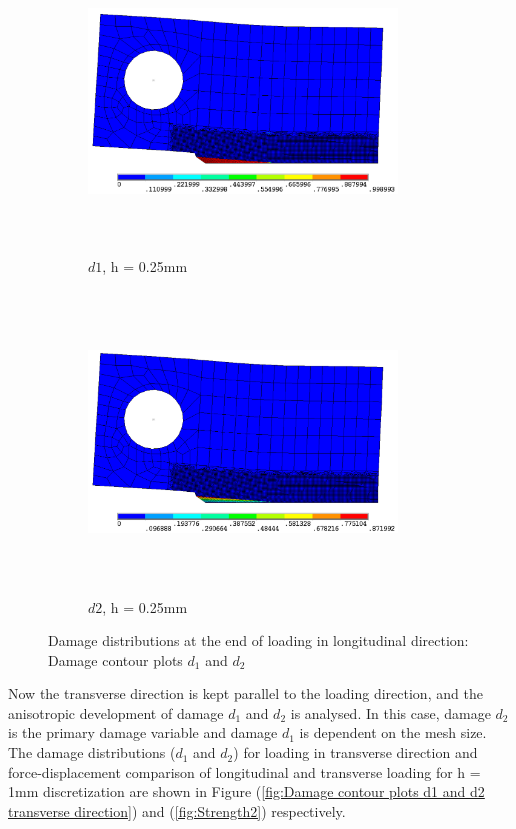 \documentclass[12pt,a4paper,twoside,openright]{report}
\begin{document}
\begin{figure}[htbp!]\ContinuedFloat
     \begin{subfigure}{0.4\textwidth}
         \includegraphics[width=8.2cm,height=8cm,keepaspectratio]{26.d1-0.25.png}
         \caption{$d1$, h = 0.25mm}
         \label{fig:d1-0.25}
     \end{subfigure}
     \hspace{2cm}
     \begin{subfigure}{0.4\textwidth}
         \includegraphics[width=8.2cm,height=8cm,keepaspectratio]{26.d2-0.25.png}
         \caption{$d2$, h = 0.25mm}
         \label{fig:d2-0.25}
     \end{subfigure}     
        \caption{Damage distributions at the end of loading in longitudinal direction: Damage contour plots $d_{1}$ and $d_{2}$ }
        \label{fig: Damage contour plots d1 and d2}     
\end{figure}
\FloatBarrier 
\indent\indent\indent Now the transverse direction is kept parallel to the loading direction, and the anisotropic development of damage $d_{1}$ and $d_{2}$ is analysed. In this case, damage $d_{2}$ is the primary damage variable and damage $d_{1}$ is dependent on the mesh size.  The damage distributions ($d_{1}$ and $d_{2}$) for loading in transverse direction and force-displacement comparison of  longitudinal and transverse loading for h = 1mm discretization are shown in Figure (\ref{fig:Damage contour plots d1 and d2 transverse direction}) and (\ref{fig:Strength2}) respectively.\\\\
\end{document}
